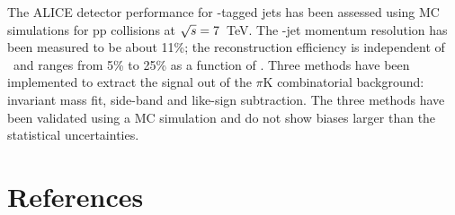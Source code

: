 \documentclass[a4paper]{jpconf}
\begin{document}
The ALICE detector performance for \Dzero-tagged jets has been assessed using MC simulations
for pp collisions at $\sqrt{s}=7$~TeV. The \Dzero-jet momentum resolution has been measured to be about 11\%; the reconstruction efficiency is independent of \ptchjet\ and ranges from 5\% to 25\% as a function of \ptd.
Three methods have been implemented to extract the signal out of the $\pi$K combinatorial background: invariant mass fit, side-band and like-sign subtraction.
The three methods have been validated using a MC simulation and do not show biases larger than the statistical uncertainties.

\section*{References}
{}

\end{document}
